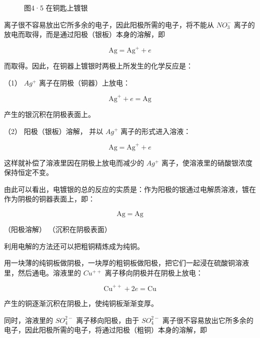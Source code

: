 \begin{figure}
\centering
\caption{图4·5 在铜匙上镀银}
\end{figure}

离子很不容易放出它所多余的电子，因此阳极所需的电子，将不能从
\(NO_{3}^{-}\) 离子的放电而取得，而是通过阳极（银板）本身的溶解，即

\[
\mathrm{Ag} = \mathrm{Ag} ^ {+} + e
\]

而取得。因此，在铜器上镀银时两极上所发生的化学反应是：

（1） \(Ag^{+}\) 离子在阴极（铜器）上放电：

\[
\mathrm{Ag} ^ {+} + e = \mathrm{Ag}
\]

产生的银沉积在阴极表面上。

（2） 阳极（银板）溶解， 并以 \(Ag^{+}\) 离子的形式进入溶液：

\[
\mathrm{Ag} = \mathrm{Ag} ^ {+} + e
\]

这样就补偿了溶液里因在阴极上放电而减少的 \(Ag^{+}\)
离子，使溶液里的硝酸银浓度保持恒定不变。

由此可以看出，电镀银的总的反应的实质是：作为阳极的银通过电解质溶液，镀在作为阴极的铜器表面上，即：

\[
\mathrm{Ag} = \mathrm{Ag}
\]

（阳极溶解） （沉积在阴极表面）

利用电解的方法还可以把粗铜精炼成为纯铜。

用一块薄的纯铜板做阴极，一块厚的粗铜板做阳极，把它们一起浸在硫酸铜溶液里，然后通电。溶液里的
\(Cu^{++}\) 离子移向阴极并在阴极上放电：

\[
\mathrm{Cu} ^ {+ +} + 2 e = \mathrm{Cu}
\]

产生的铜逐渐沉积在阴极上，使纯铜板渐渐变厚。

同时，溶液里的 \(SO_{4}^{2-}\) 离子移向阳极，由于 \(SO_{4}^{2-}\)
离子很不容易放出它所多余的电子，因此阳极所需的电子，将通过阳极（粗铜）本身的溶解，即


